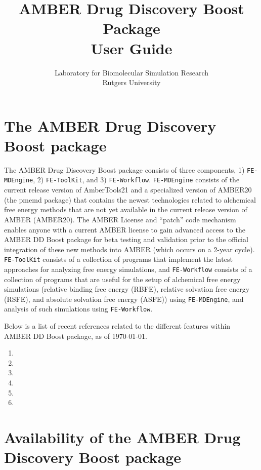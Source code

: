 \documentclass[11pt,letterpaper,titlepage]{article}
\title{%
{\bf AMBER Drug Discovery Boost Package} \\
\Large User Guide}
\author{Laboratory for Biomolecular Simulation Research \\
\large Rutgers University}
\newcommand{\addb}{\texttt{FE-MDEngine}}
\newcommand{\tk}{\texttt{FE-ToolKit}}
\newcommand{\wf}{\texttt{FE-Workflow}}
\begin{document}
\nobibliography*
\maketitle

\section {The AMBER Drug Discovery Boost package}
\vspace{0.1cm}

The AMBER Drug Discovery Boost package consists of three components, 
1) \addb{}, 2) \tk{}, and 3) \wf{}. \addb{} consists of the 
current release version of
AmberTools21 and a specialized version of AMBER20 (the pmemd package) 
that contains the newest technologies related to alchemical free 
energy methods that are not yet available in the current 
release version of AMBER (AMBER20). 
The AMBER License and “patch” code mechanism enables anyone
with a current AMBER license to gain advanced access to  
the AMBER DD Boost package for beta testing and 
validation prior to the official integration 
of these new methods into AMBER (which occurs 
on a 2-year cycle).
\tk{} consists of a collection of programs that 
implement the latest approaches for analyzing free energy simulations, 
and \wf{} consists of a collection of programs that are useful
for the setup of alchemical free energy simulations (relative binding
free energy (RBFE), relative solvation free energy (RSFE), and 
absolute solvation free energy (ASFE)) using \addb{}, and 
analysis of such simulations using \wf{}. 

Below is a list of recent references related to the different 
features within AMBER DD Boost package, as of \today. 
\begin{enumerate}
	\item{}
	\item{}
	\item{}
	\item{}
	\item{}
	\item{}
\end{enumerate}


\vspace{0.1cm}
\section {Availability of the AMBER Drug Discovery Boost package}
\vspace{0.1cm}
\end{document}
